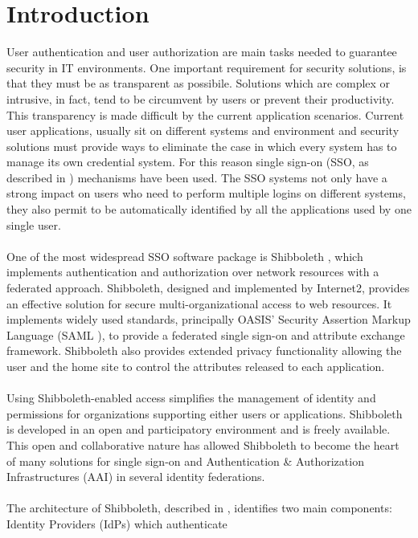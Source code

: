 \label{sec:introduction}
\section{Introduction}
User authentication and user authorization are main tasks needed to guarantee security in IT environments.
One important requirement for security solutions, is that they must be as transparent as possibile.
Solutions which are complex or intrusive, in fact, tend to be circumvent by users or prevent their productivity.
This transparency is made difficult by the current application scenarios.
Current user applications, usually sit on different systems and environment and security solutions must provide ways
to eliminate the case in which every system has to manage its own credential system.
For this reason single sign-on (SSO, as described in \cite{Shaer-1995}) mechanisms have been used.
The SSO systems not only have a strong impact on users who need to perform multiple logins on different systems, they also permit to be
automatically identified by all the applications used by one single user.\\
\\
One of the most widespread SSO software package is Shibboleth \cite{Morgan-2004}, which implements authentication and authorization over
network resources with a federated approach.
Shibboleth, designed and implemented by Internet2, provides an effective solution for secure multi-organizational access to web resources.
It implements widely used standards, principally OASIS' Security Assertion Markup Language (SAML \cite{Cantor-2005}), to
provide a federated single sign-on and attribute exchange framework.
Shibboleth also provides extended privacy functionality allowing the user and the home site to control the attributes released to
each application.\\
\\
Using Shibboleth-enabled access simplifies the management of identity and permissions for organizations supporting either users or
applications.
Shibboleth is developed in an open and participatory environment and is freely available.
This open and collaborative nature has allowed Shibboleth to become the heart of many solutions for single sign-on and Authentication \&
Authorization Infrastructures (AAI) in several identity federations.\\
\\
The architecture of Shibboleth, described in \cite{Erdos-2005}, identifies two main components: Identity Providers (IdPs) which authenticate
